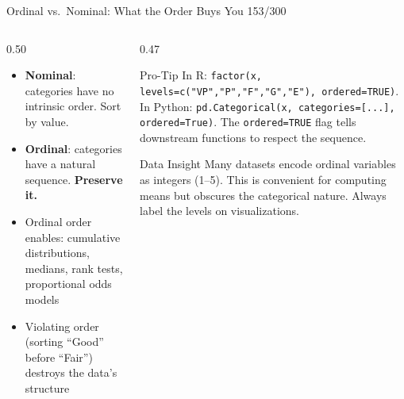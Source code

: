 \documentclass[10pt]{beamer}
\newcommand{\smark}[1]{\hfill{\scriptsize\color{codegray}#1}}
\begin{document}
\begin{frame}{Ordinal vs.\ Nominal: What the Order Buys You}
\smark{153/300}
\begin{columns}[T]
\begin{column}{0.50\textwidth}
\begin{itemize}
    \item \textbf{Nominal}: categories have no intrinsic order. Sort by value.
    \item \textbf{Ordinal}: categories have a natural sequence. \textbf{Preserve it.}
    \item Ordinal order enables: cumulative distributions, medians, rank tests, proportional odds models
    \item Violating order (sorting ``Good'' before ``Fair'') destroys the data's structure
\end{itemize}
\end{column}
\begin{column}{0.47\textwidth}
\begin{alertblock}{Pro-Tip}
    \scriptsize In R: \texttt{factor(x, levels=c("VP","P","F","G","E"), ordered=TRUE)}. In Python: \texttt{pd.Categorical(x, categories=[...], ordered=True)}. The \texttt{ordered=TRUE} flag tells downstream functions to respect the sequence.
\end{alertblock}
\vspace{0.1cm}
\begin{exampleblock}{Data Insight}
    \scriptsize Many datasets encode ordinal variables as integers (1--5). This is convenient for computing means but obscures the categorical nature. Always label the levels on visualizations.
\end{exampleblock}
\end{column}
\end{columns}
\end{frame}
\end{document}
